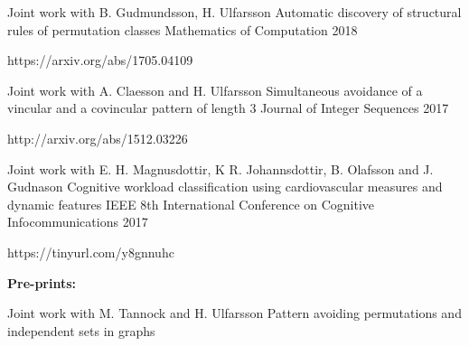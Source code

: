 


\begin{cventries}
  \cventry
    {Joint work with B. Gudmundsson, H. Ulfarsson} %
    {Automatic discovery of structural rules of permutation classes} %
    {Mathematics of Computation} %
    {2018} %
    {
      \begin{cvitems} %
        \item {https://arxiv.org/abs/1705.04109}
      \end{cvitems}
    }
  \cventry
    {Joint work with A. Claesson and H. Ulfarsson} %
    {Simultaneous avoidance of a vincular and a covincular pattern of length 3} %
    {Journal of Integer Sequences} %
    {2017} %
    {
      \begin{cvitems} %
        \item {http://arxiv.org/abs/1512.03226}
      \end{cvitems}
    }
  \cventry
    {Joint work with E. H. Magnusdottir, K R. Johannsdottir, B. Olafsson and J. Gudnason} %
    {Cognitive workload classification using cardiovascular measures and dynamic features\vspace{-1em}} %
    {\vspace{-0.5em}IEEE 8th International Conference on Cognitive Infocommunications} %
    {2017} %
    {
    \begin{cvitems} %
      \item {https://tinyurl.com/y8gnnuhc}
    \end{cvitems}
    }
\begin{flushleft}
  \textbf{Pre-prints:}
\end{flushleft}
  \cventry
    {Joint work with M. Tannock and H. Ulfarsson} %
    {Pattern avoiding permutations and independent sets in graphs} %

\end{cventries}
